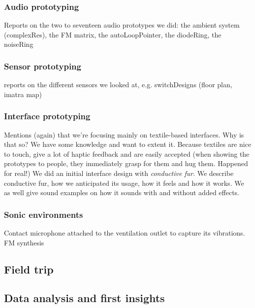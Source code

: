 \documentclass{chi-ext}
\begin{document}
\begin{multicols}{2}
\subsubsection{Audio prototyping}
\label{sec:audio_prototyping}

Reports on the two to seventeen audio prototypes we did: 
the ambient system (complexRes), the FM matrix, the autoLoopPointer, the diodeRing, the noiseRing


\subsubsection{Sensor prototyping}
\label{sec:sensor_prototyping}
reports on the different sensors we looked at, e.g. switchDesigns (floor plan, imatra map)


\subsubsection{Interface prototyping}
\label{sec:interface_prototyping}

Mentions (again) that we're focusing mainly on textile-based interfaces.
Why is that so? 
	We have some knowledge and want to extent it. 
	Because textiles are nice to touch, give a lot of haptic feedback and are easily accepted (when showing the prototypes to people, they immediately grasp for them and hug them. Happened for real!)
We did an initial interface design with \emph{conductive fur}. 
We describe conductive fur, how we anticipated its usage, how it feels and how it works.
We as well give sound examples on how it sounds with and without added effects.

\subsubsection{Sonic environments}
\label{sec:sonic_environments}

Contact microphone attached to the ventilation outlet to capture its vibrations.
FM synthesis

\subsection{Field trip}
\label{sec:field_trip}










\subsection{Data analysis and first insights}
\label{sec:data_analysis}


\end{multicols}
\end{document}
